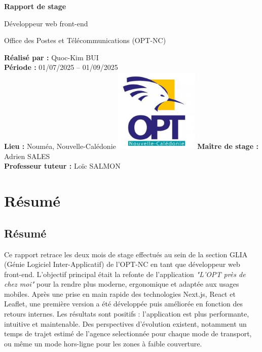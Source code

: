 \documentclass[12pt,a4paper]{report}
\begin{document}
\begin{titlepage}
\centering
{\Huge\bfseries Rapport de stage \par}
\vspace{1cm}
{\Large Développeur web front-end \par}
\vspace{1cm}
{\Large Office des Postes et Télécommunications (OPT-NC) \par}
\vfill
\textbf{Réalisé par :} Quoc-Kim BUI \\
\textbf{Période :} 01/07/2025 – 01/09/2025 \\
\textbf{Lieu :} Nouméa, Nouvelle-Calédonie
\vfill
\includegraphics[width=0.3\textwidth]{ressources_rapport/logo_opt.jpg}
\vfill
\textbf{Maître de stage :} Adrien SALES \\
\textbf{Professeur tuteur :} Loïc SALMON
\end{titlepage}

\chapter*{Résumé}

\section*{Résumé}
Ce rapport retrace les deux mois de stage effectués au sein de la section GLIA (Génie Logiciel Inter-Applicatif) de l’OPT-NC en tant que développeur web front-end.  
L’objectif principal était la refonte de l’application \textit{"L’OPT près de chez moi"} pour la rendre plus moderne, ergonomique et adaptée aux usages mobiles.  
Après une prise en main rapide des technologies Next.js, React et Leaflet, une première version a été développée puis améliorée en fonction des retours internes.  
Les résultats sont positifs : l’application est plus performante, intuitive et maintenable.  
Des perspectives d’évolution existent, notamment un temps de trajet estimé de l'agence selectionnée pour chaque mode de transport, ou même un mode hors-ligne pour les zones à faible couverture.
\end{document}
